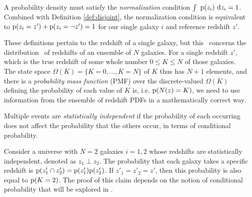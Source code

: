 \begin{definition}\label{def:normalization}
	A probability density must satisfy the \textit{normalization} condition $\int\ \mathrm{p}(z_{i})\ \mathrm{d} z_{i} = 1$.
	Combined with Definition \ref{def:disjoint}, the normalization condition is equivalent to $\mathrm{p}(z_{i} = z') + \mathrm{p}(z_{i} = \lnot z') = 1$ for our single galaxy $i$ and reference redshift $z'$.
\end{definition}

These definitions pertain to the redshift of a single galaxy, but this \paper\ concerns the distribution \Nz\ of redshifts of an ensemble of $N$ galaxies.
For a single redshift $z'$, which is the true redshift of some whole number $0 \leq K \leq N$ of those galaxies.
The state space $\Omega(K) = \{K = 0, \dots, K = N\}$ of $K$ thus has $N + 1$ elements, and there is a \textit{probability mass function} (PMF) over the discrete-valued $\Omega(K)$ defining the probability of each value of $K$ is, i.e. $\mathrm{p}(N(z) = K)$, we need to use information from the ensemble of redshift PDFs in a mathematically correct way.

\begin{definition}\label{def:independence}
	Multiple events are \textit{statistically independent} if the probability of each occurring does not affect the probability that the others occur, in terms of conditional probability.
\end{definition}

\begin{claim}\label{cla:intersection}
	Consider a universe with $N = 2$ galaxies $i = 1, 2$ whose redshifts are statistically independent, denoted as $z_{1} \perp z_{2}$.
	The probability that each galaxy takes a specific redshift is $\mathrm{p}(z_{1}' \cap z_{2}') = \mathrm{p}(z_{1}') \mathrm{p}(z_{2}')$.
	If $z'_{1} = z'_{2} = z'$, then this probability is also equal to $\mathrm{p}(K = 2)$.
	The proof of this claim depends on the notion of conditional probability that will be explored in .
\end{claim}


